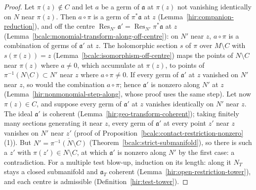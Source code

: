 \begin{proof}
\leanok
Let \(\pi(z)\notin C\) and let \(a\) be a germ of \(\mathfrak a\) at \(\pi(z)\) not vanishing identically on \(N\) near \(\pi(z)\). Then \(a\circ\pi\) is a germ of
\(\pi^*\mathfrak a\) at \(z\) (Lemma~\ref{hir:companion-reduction}), and off the centre \(\operatorname{Res}_{N'}\mathfrak a'=\operatorname{Res}_{N'}\pi^*\mathfrak a\) at \(z\)
(Lemma~\ref{bcalc:monomial-transform-along-off-centre}): on \(N'\) near \(z\), \(a\circ\pi\) is a combination of germs of \(\mathfrak a'\) at \(z\). The holomorphic section
\(s\) of \(\pi\) over \(M\setminus C\) with \(s(\pi(z))=z\) (Lemma~\ref{bcalc:isomorphism-off-centre}) maps the points of \(N\setminus C\) near \(\pi(z)\) where \(a\ne0\), which
accumulate at \(\pi(z)\), to points of \(\pi^{-1}(N\setminus C)\subset N'\) near \(z\) where \(a\circ\pi\ne0\). If every germ of \(\mathfrak a'\) at \(z\) vanished on \(N'\) near
\(z\), so would the combination \(a\circ\pi\); hence \(\mathfrak a'\) is nonzero along \(N'\) at \(z\) (Lemma~\ref{hir:nonmonomial-step-along}, whose proof uses the same
step). Let now \(\pi(z)\in C\), and suppose every germ of \(\mathfrak a'\) at \(z\) vanishes identically on \(N'\) near \(z\). The ideal \(\mathfrak a'\) is coherent
(Lemma~\ref{hir:geo-transform-coherent}); taking finitely many sections generating it near \(z\), every germ of \(\mathfrak a'\) at every point \(z'\) near \(z\) vanishes on
\(N'\) near \(z'\) (proof of Proposition~\ref{bcalc:contact-restriction-nonzero}(1)). But \(N'=\overline{\pi^{-1}(N\setminus C)}\) (Theorem~\ref{bcalc:strict-submanifold}), so
there is such a \(z'\) with \(\pi(z')\in N\setminus C\), at which \(\mathfrak a'\) is nonzero along \(N'\) by the first case: a contradiction. For a multiple test blow-up,
induction on its length: along it \(N_T\) stays a closed submanifold and \(\mathfrak a_T\) coherent (Lemma~\ref{hir:open-restriction-tower}), and each centre is admissible
(Definition~\ref{hir:test-tower}).
\end{proof}

